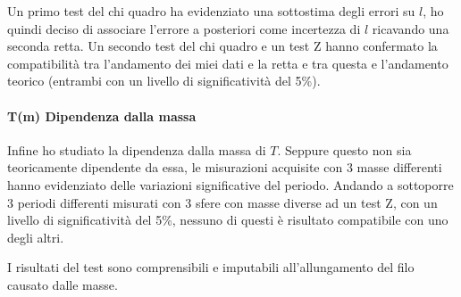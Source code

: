 \documentclass{article}
\begin{document}
	Un primo test del chi quadro ha evidenziato una sottostima degli errori su $l$, ho quindi deciso di associare l'errore a posteriori come incertezza di $l$ ricavando una seconda retta. Un secondo test del chi quadro e un test Z hanno confermato la compatibilità tra l'andamento dei miei dati e la retta e tra questa e l'andamento teorico (entrambi con un livello di significatività del 5\%).
	
	\paragraph{T(m) Dipendenza dalla massa}
	Infine ho studiato la dipendenza dalla massa di $T$. Seppure questo non sia teoricamente dipendente da essa, le misurazioni acquisite con 3 masse differenti hanno evidenziato delle variazioni significative del periodo. Andando a sottoporre 3 periodi differenti misurati con 3 sfere con masse diverse ad un test Z, con un livello di significatività del 5\%, nessuno di questi è risultato compatibile con uno degli altri.
	
	I risultati del test sono comprensibili e imputabili all'allungamento del filo causato dalle masse.
	
	
\end{document}
